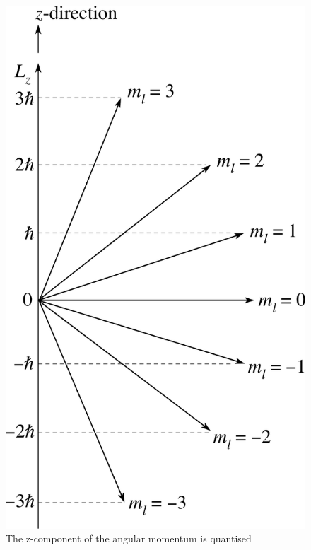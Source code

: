 \begin{figure}
	\centering
	\includegraphics[scale=0.6]{./figures/z}
	\caption{The z-component of the angular momentum is quantised } 
\end{figure}
